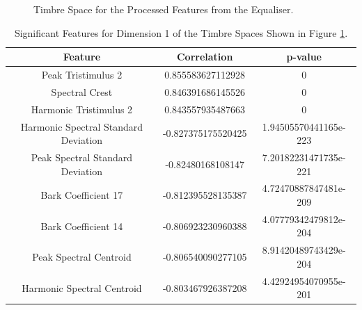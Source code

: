 	\begin{figure}[h!]
		\centering
		\qquad
		\caption{Timbre Space for the Processed Features from the Equaliser.}
		\label{fig:EqualiserProcessedMDSs}
	\end{figure}

	\begin{table}[h!]
		\centering
		\begin{tabular}{|c|c|c|}
			\hline
			\bf{Feature} & \bf{Correlation} & \bf{p-value} \\
			\hline
			\hline
			Peak Tristimulus 2 & 0.855583627112928 & 0 \\
			\hline
			Spectral Crest & 0.846391686145526 & 0 \\
			\hline
			Harmonic Tristimulus 2 & 0.843557935487663 & 0 \\
			\hline
			Harmonic Spectral Standard Deviation & -0.827375175520425 & 1.94505570441165e-223 \\
			\hline
			Peak Spectral Standard Deviation & -0.82480168108147 & 7.20182231471735e-221 \\
			\hline
			Bark Coefficient 17 & -0.812395528135387 & 4.72470887847481e-209 \\
			\hline
			Bark Coefficient 14 & -0.806923230960388 & 4.07779342479812e-204 \\
			\hline
			Peak Spectral Centroid & -0.806540090277105 & 8.91420489743429e-204 \\
			\hline
			Harmonic Spectral Centroid & -0.803467926387208 & 4.42924954070955e-201 \\
			\hline
		\end{tabular}
		\caption{Significant Features for Dimension 1 of the Timbre Spaces Shown in Figure 
			 \ref{fig:EqualiserProcessedMDSs}.}
		\label{tab:EqualiserProcessedFeaturesDim1}
	\end{table}

